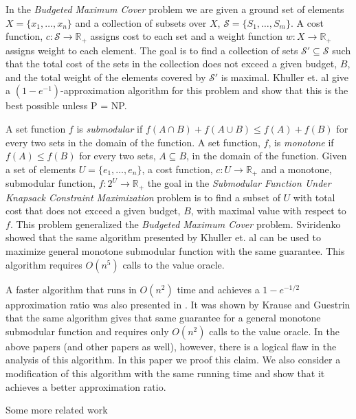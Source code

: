 In the \emph{Budgeted Maximum Cover} problem we are given a ground set of elements 
$X = \{x_1, \dots, x_n\}$ and a collection of subsets over $X$, 
$\mathcal{S} = \{S_1, \dots, S_m\}$.
A cost function, $c:\mathcal{S} \to \mathbb{R}_+$ assigns cost to each set 
and a weight function $w:X \to \mathbb{R}_+$ assigns weight to each element. 
The goal is to find a collection of sets $\mathcal{S'} \subseteq \mathcal{S}$ such that the 
total cost of the sets in the collection does not exceed a given budget, $B$, and the 
total weight of the elements covered by $\mathcal{S'}$ is maximal.
Khuller et. al \cite{khuller1999budgeted} 
give a $(1-e^{-1})$-approximation algorithm for this problem and show that this
is the best possible unless P = NP.   

A set function $f$ is \emph{submodular} if $f(A \cap B) + f(A \cup B) \leq f(A) + f(B)$ 
for every two sets in the domain of the function. A set function, $f$, is \emph{monotone} if 
$f(A) \leq f(B)$ for every two sets, $A \subseteq B$, in the domain of the function.
Given a set of elements $U = \{e_1, \dots, e_n\}$, a cost function, 
$c:U \to \mathbb{R}_+$ and a monotone, submodular function, $f:2^U \to \mathbb{R}_+$ 
the goal in the \emph{Submodular Function Under
Knapsack Constraint Maximization} problem is to find a subset of $U$ with total cost that does not exceed
a given budget, $B$, with maximal value with respect to $f$.
This problem generalized the \emph{Budgeted Maximum Cover} problem. 
Sviridenko \cite{sviridenko2004note} showed that the same algorithm presented by 
Khuller et. al can be used to maximize general monotone submodular function 
with the same guarantee.
This algorithm requires $O(n^5)$ calls to the value oracle. 

A faster algorithm that runs in $O(n^2)$ time and achieves a $1 - e^{-1/2}$ approximation ratio
was also presented in \cite{khuller1999budgeted}. 
It was shown by Krause and Guestrin \cite{krause2005note} that the same algorithm 
gives that same guarantee for a general monotone submodular function and requires only 
$O(n^2)$ calls to the value oracle.
In the above papers (and other papers as well), however, 
there is a logical flaw in the analysis of this algorithm. 
In this paper we proof this claim. 
We also consider a modification of this algorithm with the same running time and show that it
achieves a better approximation ratio.   

Some more related work~\cite{mirzasoleiman2015lazier,badanidiyuru2014fast}